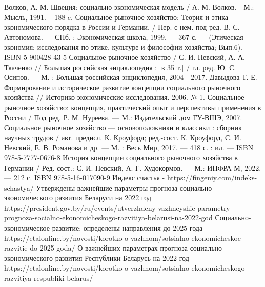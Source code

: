 \documentclass[14pt,a4paper]{article}
\begin{document}
    \newpage
    \begin{center}
        \renewcommand\refname{СПИСОК ИСПОЛЬЗОВАННЫХ ИСТОЧНИКОВ}
        \begin{thebibliography}{10}
             Волков, А. М. Швеция: социально-экономическая модель / А. М. Волков. - М.: Мысль, 1991. – 188 c.
             Социальное рыночное хозяйство: Теория и этика экономического порядка в России и Германии. / Пер. с нем. под ред. В. С. Автономова. — СПб. : Экономическая школа, 1999. — 367 с. — (Этическая экономия: исследования по этике, культуре и философии хозяйства; Вып.6). — ISBN 5-900428-43-5
             Социальное рыночное хозяйство / С. И. Невский, А. А. Ткаченко // Большая российская энциклопедия : [в 35 т.] / гл. ред. Ю. С. Осипов. — М. : Большая российская энциклопедия, 2004—2017.
             Давыдова Т. Е. Формирование и историческое развитие концепции социального рыночного хозяйства // Историко-экономические исследования. 2006. № 1.
             Социальное рыночное хозяйство: концепция, практический опыт и перспективы применения в России / Под ред. Р. М. Нуреева. — М.: Издательский дом ГУ-ВШЭ, 2007.
             Социальное рыночное хозяйство — основоположники и классики : сборник научных трудов / авт. предисл. К. Кроуфорд; ред.-сост. К. Кроуфорд, С. И. Невский, Е. В. Романова и др. — М. : Весь Мир, 2017. — 418 с. : ил. — ISBN 978-5-7777-0676-8
             История концепции социального рыночного хозяйства в Германии / Ред.-сост.: С. И. Невский, А. Г. Худокормов. — М.: ИНФРА-М, 2022. — 212 с. ISBN 978-5-16-017090-9
             Индекс счастья - https://fingeniy.com/indeks-schastya/
             Утверждены важнейшие параметры прогноза социально-экономического развития Беларуси на 2022 год
            \\
            https://president.gov.by/ru/events/utverzhdeny-vazhneyshie-parametry-prognoza-socialno-ekonomicheskogo-razvitiya-belarusi-na-2022-god
             Социально-экономическое развитие: определены направления до 2025 года
            \\
            https://etalonline.by/novosti/korotko-o-vazhnom/sotsialno-ekonomicheskoe-razvitie-do-2025-goda/
             О важнейших параметрах прогноза социально-экономического развития Республики Беларусь на 2022 год
            \\
            https://etalonline.by/novosti/korotko-o-vazhnom/sotsialno-ekonomicheskogo-razvitiya-respubliki-belarus/

\end{thebibliography}
\end{center}
\end{document}
